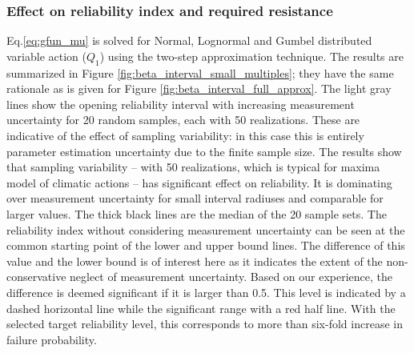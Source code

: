 \subsubsection{Effect on reliability index and required resistance}
Eq.\ref{eq:gfun_mu} is solved for Normal, Lognormal and Gumbel distributed variable action ($Q_1$) using the two-step approximation technique. The results are summarized in Figure \ref{fig:beta_interval_small_multiples}; they have the same rationale as is given for Figure \ref{fig:beta_interval_full_approx}. The light gray lines show the opening reliability interval with increasing measurement uncertainty for 20 random samples, each with 50 realizations. These are indicative of the effect of sampling variability: in this case this is entirely parameter estimation uncertainty due to the finite sample size. The results show that sampling variability -- with 50 realizations, which is typical for maxima model of climatic actions -- has significant effect on reliability. It is dominating over measurement uncertainty for small interval radiuses and comparable for larger values. The thick black lines are the median of the 20 sample sets. The reliability index without considering measurement uncertainty can be seen at the common starting point of the lower and upper bound lines. The difference of this value and the lower bound is of interest here as it indicates the extent of the non-conservative neglect of measurement uncertainty. Based on our experience, the difference is deemed significant if it is larger than 0.5. This level is indicated by a dashed horizontal line while the significant range with a red half line. With the selected target reliability level, this corresponds to more than six-fold increase in failure probability.
